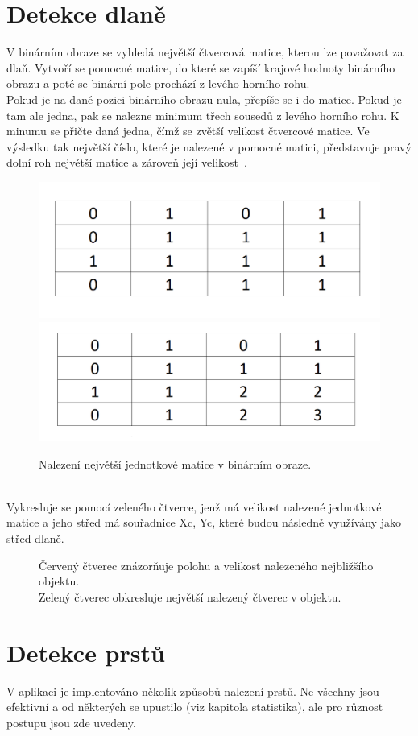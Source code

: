 \section{Detekce dlaně}
V binárním obraze se vyhledá největší čtvercová matice, kterou lze považovat za dlaň. Vytvoří se pomocné matice, do které se zapíší krajové hodnoty binárního obrazu a poté se binární pole prochází z levého horního rohu.\\
Pokud je na dané pozici binárního obrazu nula, přepíše se i do matice. Pokud je tam ale jedna, pak se nalezne minimum třech sousedů z levého horního rohu. K minumu se přičte daná jedna, čímž se zvětší velikost čtvercové matice. Ve výsledku tak největší číslo, které je nalezené v pomocné matici, představuje pravý dolní roh největší matice a zároveň její velikost~\cite{23}.
\begin{figure}[htp]
\centering
\includegraphics[width=.45\textwidth]{before.png} \hfill
\includegraphics[width=.45\textwidth]{after.png} 
\caption{Nalezení největší jednotkové matice v binárním obraze.}
\label{fig: palm}
\end{figure}\\
Vykresluje se pomocí zeleného čtverce, jenž má velikost nalezené jednotkové matice a jeho střed má souřadnice Xc, Yc, které budou následně využívány jako střed dlaně.

\begin{figure}[htp]
\centering
{}
\caption{Červený čtverec znázorňuje polohu a velikost nalezeného nejbližšího objektu.\\
Zelený čtverec obkresluje největší nalezený čtverec v objektu.}
\label{fig:square}
\end{figure}

\section{Detekce prstů}
V aplikaci je implentováno několik způsobů nalezení prstů. Ne všechny jsou efektivní a od některých se upustilo (viz kapitola statistika), ale pro různost postupu jsou zde uvedeny.

